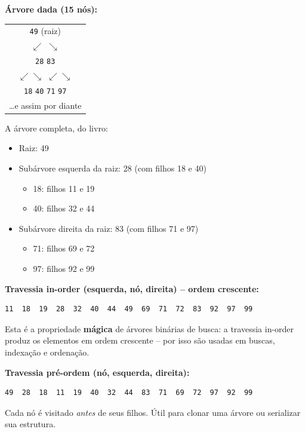 \documentclass[12pt,a4paper]{article}
\begin{document}
\begin{respostabox}
\textbf{Árvore dada (15 nós):}
\begin{center}
\begin{tabular}{c}
\texttt{49} (raiz) \\
$\swarrow$ \quad $\searrow$ \\
\texttt{28} \quad \quad \quad \texttt{83} \\
$\swarrow \searrow$ \quad \quad $\swarrow \searrow$ \\
\texttt{18} \texttt{40} \quad \texttt{71} \texttt{97} \\
\ldots e assim por diante
\end{tabular}
\end{center}

A árvore completa, do livro:
\begin{itemize}[noitemsep]
  \item Raiz: 49
  \item Subárvore esquerda da raiz: 28 (com filhos 18 e 40)
  \begin{itemize}[noitemsep]
    \item 18: filhos 11 e 19
    \item 40: filhos 32 e 44
  \end{itemize}
  \item Subárvore direita da raiz: 83 (com filhos 71 e 97)
  \begin{itemize}[noitemsep]
    \item 71: filhos 69 e 72
    \item 97: filhos 92 e 99
  \end{itemize}
\end{itemize}

\textbf{Travessia in-order (esquerda, nó, direita) -- ordem crescente:}
\begin{lstlisting}
11  18  19  28  32  40  44  49  69  71  72  83  92  97  99
\end{lstlisting}

Esta é a propriedade \textbf{mágica} de árvores binárias de busca: a travessia
in-order produz os elementos em ordem crescente -- por isso são usadas em
buscas, indexação e ordenação.

\textbf{Travessia pré-ordem (nó, esquerda, direita):}
\begin{lstlisting}
49  28  18  11  19  40  32  44  83  71  69  72  97  92  99
\end{lstlisting}

Cada nó é visitado \textit{antes} de seus filhos. Útil para clonar uma árvore
ou serializar sua estrutura.


\end{respostabox}
\end{document}

